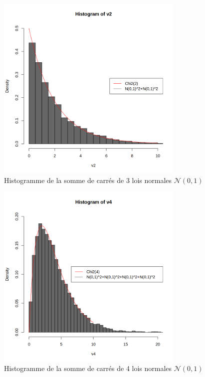 \begin{table}[H]
\begin{minipage}{0.28\textwidth}
\begin{figure}[H]
                \includegraphics[width=0.80\textwidth]{4_attachments/figures/output42.png}
                \caption{Histogramme de la somme de carrés de 3 lois normales $\mathcal N(0,1)$}
                \label{fig:fig5}
            \end{figure}
            
        \end{minipage}
        \hfill
        \begin{minipage}{0.28\textwidth}
            \centering
            \begin{figure}[H]
                \centering
                \includegraphics[width=0.80\textwidth]{4_attachments/figures/output43.png}
                \caption{Histogramme de la somme de carrés de 4 lois normales $\mathcal N(0,1)$}
                \label{fig:fig6}
            \end{figure}
            
        \end{minipage}
      \end{table}
